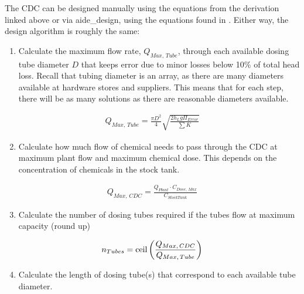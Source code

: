 \documentclass[letterpaper,10pt,english]{sphinxmanual}
\begin{document}
The CDC can be designed manually using the equations from the derivation linked above or via aide\_design, using the equations found in . Either way, the design algorithm is roughly the same:
\begin{enumerate}
\item {} 
Calculate the maximum flow rate, \(Q_{Max, \, Tube}\), through each available dosing tube diameter \(D\) that keeps error due to minor losses below 10\% of total head loss. Recall that tubing diameter is an array, as there are many diameters available at hardware stores and suppliers. This means that for each step, there will be as many solutions as there are reasonable diameters available.

\end{enumerate}
\begin{equation}\label{equation:Flow_Control_and_Measurement/FCM_Design:Flow_Control_and_Measurement/FCM_Design:2}
\begin{split}Q_{Max, \, Tube} = \frac{\pi D^2}{4} \sqrt{\frac{2 h_L g \Pi_{Error}}{\sum{K} }}\end{split}
\end{equation}\begin{enumerate}
\setcounter{enumi}{1}
\item {} 
Calculate how much flow of chemical needs to pass through the CDC at maximum plant flow and maximum chemical dose. This depends on the concentration of chemicals in the stock tank.

\end{enumerate}
\begin{equation}\label{equation:Flow_Control_and_Measurement/FCM_Design:Flow_Control_and_Measurement/FCM_Design:3}
\begin{split}Q_{Max, \, CDC} = \frac{Q_{Plant} \cdot C_{Dose, \, Max}}{C_{StockTank}}\end{split}
\end{equation}\begin{enumerate}
\setcounter{enumi}{2}
\item {} 
Calculate the number of dosing tubes required if the tubes flow at  maximum capacity (round up)

\end{enumerate}
\begin{equation}\label{equation:Flow_Control_and_Measurement/FCM_Design:Flow_Control_and_Measurement/FCM_Design:4}
\begin{split}n_{Tubes} = {\rm ceil} \left( \frac{Q_{Max, \, CDC}}{Q_{Max, \, Tube}} \right)\end{split}
\end{equation}\begin{enumerate}
\setcounter{enumi}{3}
\item {} 
Calculate the length of dosing tube(s) that correspond to each available tube diameter.

\end{enumerate}
\end{document}
